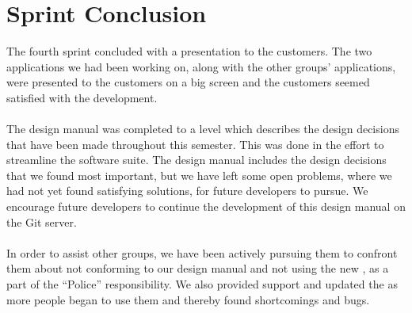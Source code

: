
\chapter{Sprint Conclusion}
\label{cha:conclusion_sprint_4}

The fourth sprint concluded with a presentation to the customers. The two applications we had been working on, along with the other groups' applications, were presented to the customers on a big screen and the customers seemed satisfied with the development. 
\\\\
The design manual was completed to a level which describes the design decisions that have been made throughout this semester. This was done in the effort to streamline the \giraf software suite. The design manual includes the design decisions that we found most important, but we have left some open problems, where we had not yet found satisfying solutions, for future \giraf developers to pursue. We encourage future \giraf developers to continue the development of this design manual on the \giraf Git server.
\\\\
In order to assist other groups, we have been actively pursuing them to confront them about not conforming to our design manual and not using the new \gc, as a part of the ``\giraf Police'' responsibility. We also provided support and updated the \gc as more people began to use them and thereby found shortcomings and bugs. 